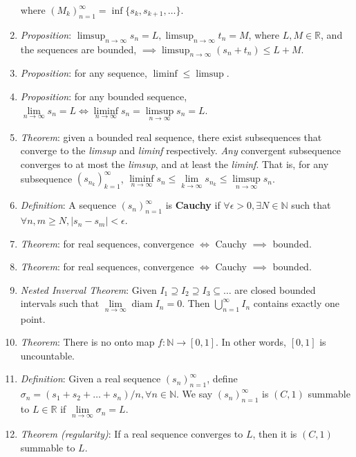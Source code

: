 \message{ !name(cheatsheet.tex)}\documentclass{article}
\newcommand{\seqn}[1]{(#1)^\infty_{n=1}}
\newcommand{\seqk}[1]{(#1)^\infty_{k=1}}
\newcommand{\real}{\mathbb{R}}
\newcommand{\nat}{\mathbb{N}}
\newcommand{\ntoinf}{\limits_{n\rightarrow\infty}}
\newcommand{\ktoinf}{\limits_{k\rightarrow\infty}}
\newcommand{\limn}[1]{\lim\ntoinf #1}
\newcommand{\limk}[1]{\lim\ktoinf #1}
\DeclareMathOperator{\diam}{diam}
\begin{document}
\begin{multicols*}{3}
\begin{enumerate}
		      where $\seqn{M_k}=\inf\{s_k, s_{k+1},\dots\}$.
		\item \emph{Proposition}:
		      $\limsup_{n\rightarrow\infty}s_n=L,\limsup_{n\rightarrow\infty}t_n=M$,
		      where $L,M\in\real$, and the sequences are bounded,
		      $\implies\limsup_{n\rightarrow\infty}(s_n+t_n)\leq L+M$.
		\item \emph{Proposition}: for any sequence, $\liminf\leq\limsup$.
		\item \emph{Proposition}: for any bounded sequence, $\limn s_n=L\iff
			      \liminf\ntoinf s_n=\limsup\ntoinf s_n=L$.
		\item \emph{Theorem}: given a bounded real sequence, there exist
		      subsequences that converge to the \emph{limsup} and \emph{liminf}
		      respectively. \emph{Any} convergent subsequence converges to at most
		      the \emph{limsup}, and at least the \emph{liminf}. That is, for any
		      subsequence $\seqk{s_{n_k}}$,
		      $\liminf\ntoinf s_n\leq\limk{s_{n_k}}\leq\limsup\ntoinf s_n$.
		\item \emph{Definition}: A sequence $\seqn{s_n}$ is \textbf{Cauchy} if
		      $\forall\epsilon>0,\exists N\in\nat$ such that
		      $\forall n,m\geq N,|s_n-s_m|<\epsilon$.
		\item \emph{Theorem}: for real sequences, convergence $\iff$ Cauchy
		      $\implies$ bounded.
		\item \emph{Theorem}: for real sequences, convergence $\iff$ Cauchy
		      $\implies$ bounded.
		\item \emph{Nested Inverval Theorem}: Given $I_1\supseteq I_2\supseteq
			      I_3\subseteq\dots$ are closed bounded intervals such that
		      $\limn\diam I_n=0$. Then $\bigcup\limits_{n=1}^\infty I_n$ contains
		      exactly one point.
		\item \emph{Theorem}: There is no onto map $f:\nat\rightarrow[0,1]$. In
		      other words, $[0,1]$ is uncountable.
		\item \emph{Definition}: Given a real sequence $\seqn{s_n}$, define
		      $\sigma_n=(s_1+s_2+\dots+s_n)/n,\forall n\in\nat$. We say
		      $\seqn{s_n}$ is $(C,1)$ summable to $L\in\real$ if $\limn\sigma_n=L$.
		\item \emph{Theorem (regularity)}: If a real sequence converges to $L$,
		      then it is $(C,1)$ summable to $L$.
	\end{enumerate}


\end{multicols*}
\end{document}
